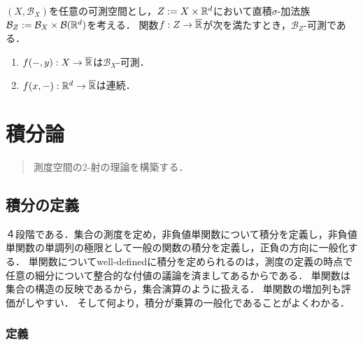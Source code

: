 \documentclass[uplatex, dvipdfmx]{jsreport}
\renewcommand{\B}{\mathcal{B}}
\begin{document}
\begin{theorem}[直積の普遍性の破れ]
    $(X,\B_X)$を任意の可測空間とし，$Z:=X\times\mathbb{R}^d$において直積$\sigma$-加法族$\B_Z:=\B_X\times\B(\R^d)$を考える．
    関数$f:Z\to\overline{\mathbb{R}}$が次を満たすとき，$\B_Z$-可測である．
    \begin{enumerate}
        \item $f(-,y):X\to\overline{\mathbb{R}}$は$\B_X$-可測．
        \item $f(x,-):\mathbb{R}^d\to\overline{\mathbb{R}}$は連続．
    \end{enumerate}
\end{theorem}

\chapter{積分論}

\begin{quotation}
    測度空間の2-射の理論を構築する．
\end{quotation}

\section{積分の定義}

\begin{tcolorbox}[colframe=ForestGreen, colback=ForestGreen!10!white,breakable,colbacktitle=ForestGreen!40!white,coltitle=black,fonttitle=\bfseries\sffamily,
title=]
    ４段階である．集合の測度を定め，非負値単関数について積分を定義し，非負値単関数の単調列の極限として一般の関数の積分を定義し，正負の方向に一般化する．
    単関数についてwell-definedに積分を定められるのは，測度の定義の時点で任意の細分について整合的な付値の議論を済ましてあるからである．
    単関数は集合の構造の反映であるから，集合演算のように扱える．
    単関数の増加列も評価がしやすい．
    そして何より，積分が乗算の一般化であることがよくわかる．
\end{tcolorbox}

\subsection{定義}
\end{document}
